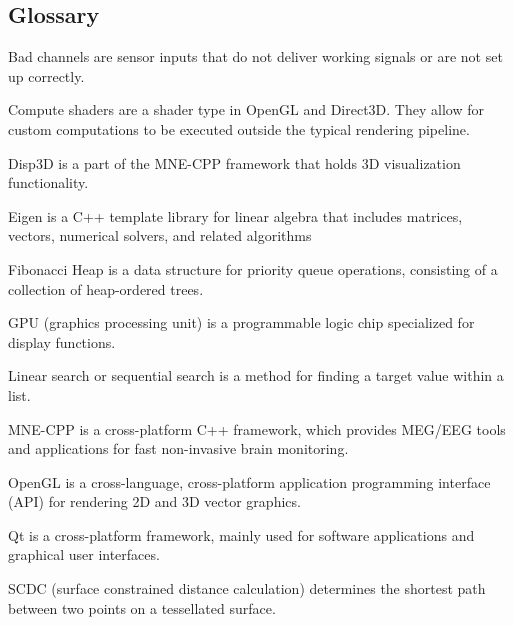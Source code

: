 \subsection {Glossary}
\begin{aims}

\item [Bad channels] are sensor inputs that do not deliver working signals or are not set up correctly.
\item [Compute shaders] are a shader type in OpenGL and Direct3D. They allow for custom computations to be executed outside the typical rendering pipeline.
\item [Disp3D] is a part of the MNE-CPP framework that holds 3D visualization functionality.
\item[Eigen] is a C++ template library for linear algebra that includes matrices, vectors, numerical solvers, and related algorithms
\item [Fibonacci Heap] is a data structure for priority queue operations, consisting of a collection of heap-ordered trees.
\item [GPU] (graphics processing unit) is a programmable logic chip specialized for display functions.
\item [Linear search] or sequential search is a method for finding a target value within a list.
\item [MNE-CPP] is a cross-platform C++ framework, which provides MEG/EEG tools and applications for fast non-invasive brain monitoring.
\item [OpenGL] is a cross-language, cross-platform application programming interface (API) for rendering 2D and 3D vector graphics.
\item [Qt] is a cross-platform framework, mainly used for software applications and graphical user interfaces.
\item [SCDC] (surface constrained distance calculation) determines the shortest path between two points on a tessellated surface.
\end{aims} 
